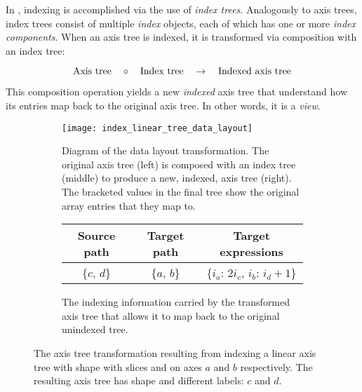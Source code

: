 \documentclass[thesis]{subfiles}
\begin{document}
In , indexing is accomplished via the use of \textit{index trees}.
Analogously to axis trees, index trees consist of multiple \textit{index} objects, each of which has one or more \textit{index components}.
When an axis tree is indexed, it is transformed via composition with an index tree:

\begin{equation*}
  \textnormal{Axis tree} \quad \circ \quad \textnormal{Index tree} \quad \to \quad \textnormal{Indexed axis tree}
\end{equation*}

This composition operation yields a new \textit{indexed} axis tree that understand how its entries map back to the original axis tree.
In other words, it is a \textit{view}.

\begin{figure}
  \centering
  \begin{subfigure}{\textwidth}
    \centering
    \texttt{[image: index\_linear\_tree\_data\_layout]}
    \caption{
      Diagram of the data layout transformation.
      The original axis tree (left) is composed with an index tree (middle) to produce a new, indexed, axis tree (right).
      The bracketed values in the final tree show the original array entries that they map to.
    }
    \label{fig:index_linear_tree_data_layout}
  \end{subfigure}

  \vspace{1em}

  \begin{subfigure}{\textwidth}
    \centering
    \begin{tabular}{|c|c|c|}
      \hline
      \textbf{Source path} & \textbf{Target path} & \textbf{Target expressions} \\
      \hline
      \{$c$, $d$\} & \{$a$, $b$\} & \{$i_a$: $2 i_c$, $i_b$: $i_d+1$\} \\
      \hline
    \end{tabular}
    \caption{
      The indexing information carried by the transformed axis tree that allows it to map back to the original unindexed tree.
    }
    \label{fig:index_linear_tree_exprs}
  \end{subfigure}

  \caption{
    The axis tree transformation resulting from indexing a linear axis tree with shape  with slices \pycode{[::2]} and \pycode{[1::]} on axes $a$ and $b$ respectively.
    The resulting axis tree has shape  and different labels: $c$ and $d$.
  }
  \label{fig:index_linear_tree_all}
\end{figure}
\end{document}
